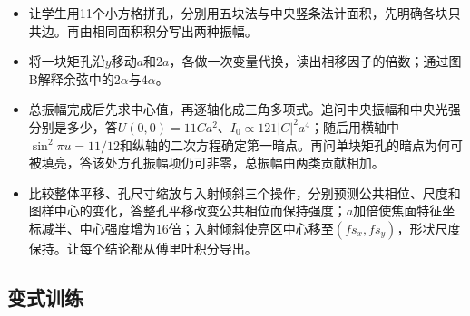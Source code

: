 \documentclass[UTF8,fontset=fandol,a4paper,11pt]{ctexart}
\begin{document}
\begin{itemize}
\item 让学生用11个小方格拼孔，分别用五块法与中央竖条法计面积，先明确各块只共边。再由相同面积积分写出两种振幅。
\item 将一块矩孔沿$y$移动$a$和$2a$，各做一次变量代换，读出相移因子的倍数；通过图B解释余弦中的$2\alpha$与$4\alpha$。
\item 总振幅完成后先求中心值，再逐轴化成三角多项式。追问中央振幅和中央光强分别是多少，答$U(0,0)=11Ca^2$、$I_0\propto121|C|^2a^4$；随后用横轴中$\sin^2\pi u=11/12$和纵轴的二次方程确定第一暗点。再问单块矩孔的暗点为何可被填亮，答该处方孔振幅项仍可非零，总振幅由两类贡献相加。
\item 比较整体平移、孔尺寸缩放与入射倾斜三个操作，分别预测公共相位、尺度和图样中心的变化，答整孔平移改变公共相位而保持强度；$a$加倍使焦面特征坐标减半、中心强度增为16倍；入射倾斜使亮区中心移至$(fs_x,fs_y)$，形状尺度保持。让每个结论都从傅里叶积分导出。
\end{itemize}



\subsection*{变式训练}
\end{document}
